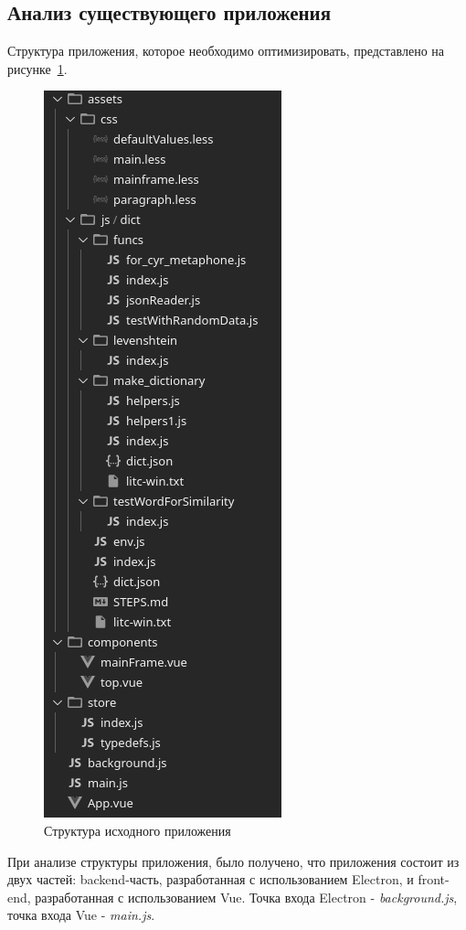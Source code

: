\subsection{Анализ существующего приложения}

Структура приложения, которое необходимо оптимизировать, представлено на рисунке~\ref{img:oldStruct}.

\begin{figure}[H]
  \centering
  \includegraphics[height=0.4\textheight]{assets/images/practical/oldStructure.png}
  \caption{Структура исходного приложения}
  \label{img:oldStruct}
\end{figure}

При анализе структуры приложения, было получено, что приложения состоит из двух частей: backend-часть, разработанная с использованием Electron, и front-end, разработанная с использованием Vue. Точка входа Electron - \emph{background.js}, точка входа Vue - \emph{main.js}.


